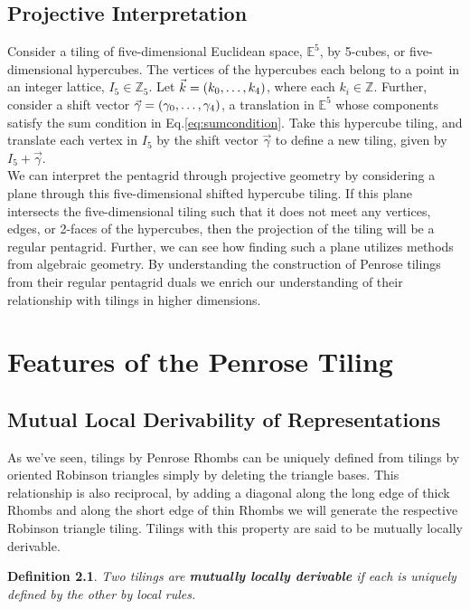 \documentclass[
  oneside,
  11pt, a4paper,
  footinclude=true,
  headinclude=true,
  cleardoublepage=empty
]{scrbook}
\newtheorem{mydef}{Definition}
\begin{document}
\section{Projective Interpretation}
Consider a tiling of five-dimensional Euclidean space, $\mathbb{E}^5$, by 5-cubes, or five-dimensional hypercubes. The vertices of the hypercubes each belong to a point in an integer lattice, $I_5 \in \mathbb{Z}_5$. Let $\vec{k}=(k_0,\mathellipsis, k_4)$, where each $k_i \in \mathbb{Z}$. Further, consider a shift vector $\vec{\gamma}=(\gamma_0,\mathellipsis, \gamma_4)$, a translation in $\mathbb{E}^5$ whose components satisfy the sum condition in Eq.\ref{eq:sumcondition}. Take this hypercube tiling, and translate each vertex in $I_5$ by the shift vector $\vec{\gamma}$ to define a new tiling, given by $I_5 + \vec{\gamma}$.\\
We can interpret the pentagrid through projective geometry by considering a plane through this five-dimensional shifted hypercube tiling. If this plane intersects the five-dimensional tiling such that it does not meet any vertices, edges, or 2-faces of the hypercubes, then the projection of the tiling will be a regular pentagrid. Further, we can see how finding such a plane utilizes methods from algebraic geometry. 
By understanding the construction of Penrose tilings from their regular pentagrid duals we enrich our understanding of their relationship with tilings in higher dimensions.


\chapter{Features of the Penrose Tiling}
\section{Mutual Local Derivability of Representations} %
As we've seen, tilings by Penrose Rhombs can be uniquely defined from tilings by oriented Robinson triangles simply by deleting the triangle bases. This relationship is also reciprocal, by adding a diagonal along the long edge of thick Rhombs and along the short edge of thin Rhombs we will generate the respective Robinson triangle tiling. Tilings with this property are said to be mutually locally derivable.

\begin{mydef}
Two tilings are \textbf{mutually locally derivable} if each is uniquely defined by the other by local rules. 
\end{mydef}
\end{document}

